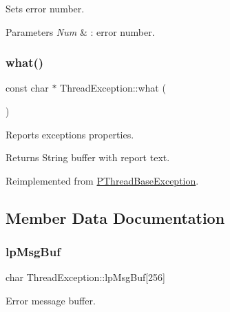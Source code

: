 Sets error number. 
\begin{DoxyParams}{Parameters}
{\em Num} & \+: error number. \\
\hline
\end{DoxyParams}
\mbox{\label{classThreadException_a3b8dcf8e441a9cba0539ca2455087e57}} 
\subsubsection{\texorpdfstring{what()}{what()}}
{\footnotesize\ttfamily const char $\ast$ Thread\+Exception\+::what (\begin{DoxyParamCaption}{ }\end{DoxyParamCaption})\hspace{0.3cm}{\ttfamily [virtual]}}

Reports exception\textquotesingle{}s properties. \begin{DoxyReturn}{Returns}
String buffer with report text. 
\end{DoxyReturn}


Reimplemented from \hyperlink{group__EXCEPT__GROUP_ga4389169c01caec3fe93ac45a5d69a9ec}{P\+Thread\+Base\+Exception}.



\subsection{Member Data Documentation}
\mbox{\label{classThreadException_a7687b9835112b0381c09ac0b52637be1}} 
\subsubsection{\texorpdfstring{lp\+Msg\+Buf}{lpMsgBuf}}
{\footnotesize\ttfamily char Thread\+Exception\+::lp\+Msg\+Buf\mbox{[}256\mbox{]}\hspace{0.3cm}{\ttfamily [protected]}}



Error message buffer. 

\mbox{\label{classThreadException_af35c621f09ff63e9928a8ad5ce596d34}} 
